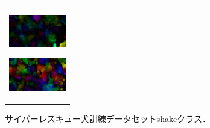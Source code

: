 \begin{figure}[H]
\begin{tabular}{l}
\begin{minipage}{0.165\hsize}
        \begin{center}
          \includegraphics[clip, width=2.5cm]{./Figures/optic_shake4.eps}
          \hspace{0.1cm} { }
        \end{center}
      \end{minipage}
      \begin{minipage}{0.165\hsize}
        \begin{center}
          \includegraphics[clip, width=2.5cm]{./Figures/optic_shake5.eps}
          \hspace{2.2cm} { }
        \end{center}
      \end{minipage}
    \end{tabular}
    \caption{サイバーレスキュー犬訓練データセットshakeクラス．}
    \label{shake}
\end{figure}

